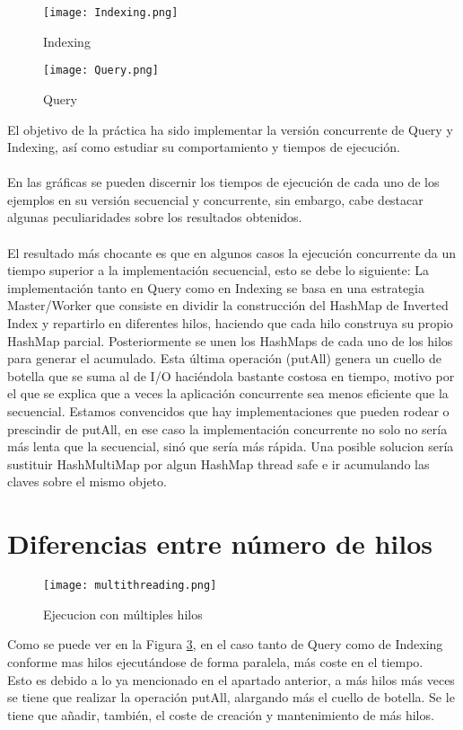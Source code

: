\documentclass{article}
\begin{document}
\begin{figure}[hbt!]
  \texttt{[image: Indexing.png]}
  \caption{Indexing}
  \label{fig:indexing}
\end{figure}
\begin{figure}[hbt!]
  \texttt{[image: Query.png]}
  \caption{Query}
  \label{fig:query}
\end{figure}
\newpage
El objetivo de la práctica ha sido implementar la versión concurrente de 
Query y Indexing, así como estudiar su comportamiento y tiempos de ejecución.
\\\\ 
En las gráficas se pueden discernir los tiempos de ejecución
de cada uno de los ejemplos en su versión secuencial y concurrente,
 sin embargo, cabe destacar algunas peculiaridades sobre los resultados obtenidos.\\
\\
El resultado más chocante es que en algunos casos la ejecución 
concurrente da un tiempo superior a la implementación secuencial,
esto se debe lo siguiente:
La implementación tanto en Query como en Indexing se basa en una
estrategia Master/Worker que consiste en dividir la construcción del
HashMap de Inverted Index y repartirlo en diferentes hilos, haciendo que cada
hilo construya su propio HashMap parcial. Posteriormente se unen los HashMaps
de cada uno de los hilos para generar el acumulado. Esta última
 operación (putAll) genera un cuello de botella que se suma al de I/O haciéndola bastante costosa
en tiempo, motivo por el que se explica que a veces la aplicación concurrente
sea menos eficiente que la secuencial. Estamos convencidos que hay implementaciones
que pueden rodear o prescindir de putAll, en ese caso la implementación concurrente
no solo no sería más lenta que la secuencial, sinó que sería más rápida. Una posible 
solucion sería sustituir HashMultiMap por algun HashMap thread safe e ir 
acumulando las claves sobre el mismo objeto.

\section{Diferencias entre número de hilos}
\begin{figure}[hbt!]
  \texttt{[image: multithreading.png]}
  \caption{Ejecucion con múltiples hilos}
  \label{fig:multhilos}
\end{figure}

Como se puede ver en la Figura \ref{fig:multhilos}, en el caso tanto de Query
 como de Indexing conforme mas hilos ejecutándose de forma paralela, más coste
  en el tiempo.\\
Esto es debido a lo ya mencionado en el apartado anterior, a más hilos más veces
se tiene que realizar la operación putAll, alargando más el cuello de botella. Se 
le tiene que añadir, también, el coste de creación y mantenimiento de más hilos.\\
\end{document}
